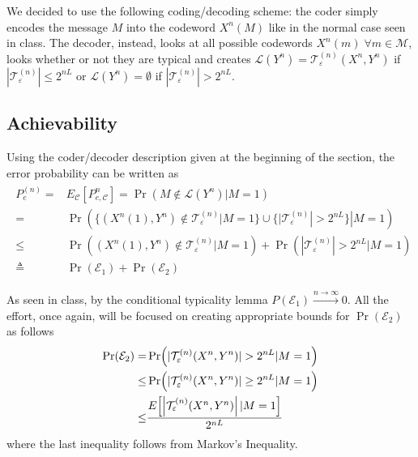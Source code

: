 
\newcommand{\typical}{\ensuremath{\mathcal{T}_\varepsilon^{(n)}}}
\newcommand{\typicalLong}{\ensuremath{\mathcal{T}_\varepsilon^{(n)}(X^n,Y^n)}}

We decided to use the following coding/decoding scheme: the coder simply encodes the message $M$ into the codeword $X^n(M)$ like in the normal case seen in class. The decoder, instead, looks at all possible codewords $X^n(m) \; \forall m\in \mathcal{M}$, looks whether or not they are typical and creates $\mathcal{L}(Y^n) = \typicalLong$ if $|\typical| \leq 2^{nL}$ or $\mathcal{L}(Y^n)=\emptyset$ if $|\typical| > 2^{nL}$.

\subsection{Achievability}
Using the coder/decoder description given at the beginning of the section, the error probability can be written as
%
\begin{align}
\begin{split}
P_e^{(n)}=&E_\mathcal{C}[P_{e,\mathcal{C}}^n] = \Pr( M\notin \mathcal{L}(Y^n) |M=1 )\\
=& \Pr( \{(X^n(1),Y^n)\notin\typical| M=1\} \cup \{ |\typical|>2^{nL} \}|M=1)\\
\leq& \Pr((X^n(1),Y^n)\notin\typical|M=1) + \Pr(|\typical|>2^{nL}|M=1)\\
\triangleq& \Pr(\mathcal{E}_1) + \Pr(\mathcal{E}_2)
\end{split}
\end{align}

As seen in class, by the conditional typicality lemma $P(\mathcal{E}_1) \xrightarrow{n\rightarrow\infty}0$. All the effort, once again, will be focused on creating appropriate bounds for $\Pr(\mathcal{E}_2)$ as follows
%
\begin{align} \label{eq:3.14_E2}
\begin{split}
\Pr(\mathcal{E}_2) =& \Pr(|\typicalLong|>2^{nL}|M=1)\\
 \leq& \Pr(|\typicalLong| \geq 2^{nL}|M=1)\\
\leq& \frac{E \qty[\qty|\typicalLong| \,|M=1]}{2^{nL}}
\end{split}
\end{align}
%
where the last inequality follows from Markov's Inequality.

